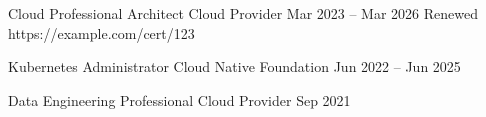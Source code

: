 %
%
%


\begin{certifications}
  \certentry
    {Cloud Professional Architect}       %
    {Cloud Provider}                     %
    {Mar 2023 – Mar 2026}                %
    {Renewed}                            %
    {https://example.com/cert/123}       %

  \certentry
    {Kubernetes Administrator}           %
    {Cloud Native Foundation}            %
    {Jun 2022 – Jun 2025}                %
    {}                                   %
    {}                                   %

  \certentry
    {Data Engineering Professional}      %
    {Cloud Provider}                     %
    {Sep 2021}                           %
    {}                                   %
    {}                                   %
\end{certifications}
